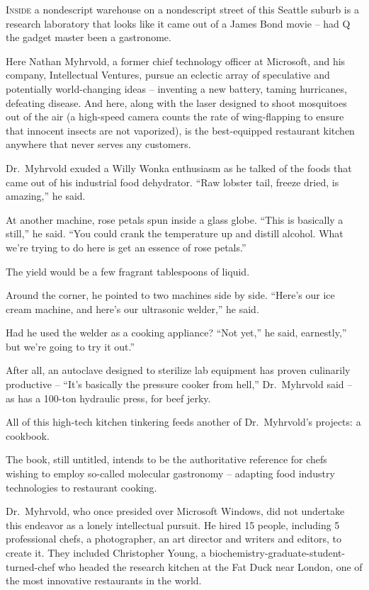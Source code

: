 ﻿\documentclass[12pt]{article}
\begin{document}
\lettrine{I}{nside} a nondescript warehouse on a nondescript street of this
Seattle suburb is a research laboratory that looks like it came out of a James Bond movie -- had Q
the gadget master been a gastronome.

Here Nathan Myhrvold, a former chief technology officer at Microsoft, and his company, Intellectual
Ventures, pursue an eclectic array of speculative and potentially world-changing ideas -- inventing
a new battery, taming hurricanes, defeating disease. And here, along with the laser designed to
shoot mosquitoes out of the air (a high-speed camera counts the rate of wing-flapping to ensure that
innocent insects are not vaporized), is the best-equipped restaurant kitchen anywhere that never
serves any customers.

Dr.~Myhrvold exuded a Willy Wonka enthusiasm as he talked of the foods that came out of his
industrial food dehydrator. ``Raw lobster tail, freeze dried, is amazing,'' he said.

At another machine, rose petals spun inside a glass globe. ``This is basically a still,'' he said.
``You could crank the temperature up and distill alcohol. What we're trying to do here is get an
essence of rose petals.''

The yield would be a few fragrant tablespoons of liquid.

Around the corner, he pointed to two machines side by side. ``Here's our ice cream machine, and
here's our ultrasonic welder,'' he said.

Had he used the welder as a cooking appliance? ``Not yet,'' he said, earnestly,'' but we're going to
try it out.''

After all, an autoclave designed to sterilize lab equipment has proven culinarily productive --
``It's basically the pressure cooker from hell,'' Dr.~Myhrvold said -- as has a 100-ton hydraulic
press, for beef jerky.

All of this high-tech kitchen tinkering feeds another of Dr.~Myhrvold's projects: a cookbook.

The book, still untitled, intends to be the authoritative reference for chefs wishing to employ
so-called molecular gastronomy -- adapting food industry technologies to restaurant cooking.

Dr.~Myhrvold, who once presided over Microsoft Windows, did not undertake this endeavor as a lonely
intellectual pursuit. He hired 15 people, including 5 professional chefs, a photographer, an art
director and writers and editors, to create it. They included Christopher Young, a
biochemistry-graduate-student-turned-chef who headed the research kitchen at the Fat Duck near
London, one of the most innovative restaurants in the world.
\end{document}
